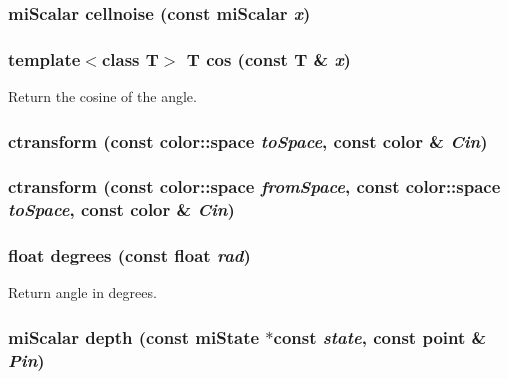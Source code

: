 \subsubsection{\setlength{\rightskip}{0pt plus 5cm}mi\-Scalar cellnoise (const mi\-Scalar {\em x})\hspace{0.3cm}{\tt  [inline]}}\label{namespacersl_a124}


\subsubsection{\setlength{\rightskip}{0pt plus 5cm}template$<$class T$>$ T cos (const T \& {\em x})\hspace{0.3cm}{\tt  [inline]}}\label{namespacersl_a31}


Return the cosine of the angle. 

\subsubsection{ ctransform (const color::space {\em to\-Space}, const color \& {\em Cin})\hspace{0.3cm}{\tt  [inline]}}\label{namespacersl_a151}


\subsubsection{ ctransform (const color::space {\em from\-Space}, const color::space {\em to\-Space}, const color \& {\em Cin})\hspace{0.3cm}{\tt  [inline]}}\label{namespacersl_a150}


\subsubsection{\setlength{\rightskip}{0pt plus 5cm}float degrees (const float {\em rad})\hspace{0.3cm}{\tt  [inline]}}\label{namespacersl_a25}


Return angle in degrees. 

\subsubsection{\setlength{\rightskip}{0pt plus 5cm}mi\-Scalar depth (const mi\-State $\ast$const {\em state}, const point \& {\em Pin})\hspace{0.3cm}{\tt  [inline]}}\label{namespacersl_a154}


